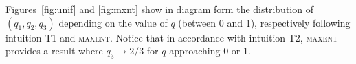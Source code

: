 \documentclass[smallextended]{svjour3}       %
\begin{document}



Figures~\ref{fig:unif} and \ref{fig:mxnt} show in diagram form the
distribution of $(q_{1},q_{2},q_{3})$ depending on the value of $q$
(between 0 and 1), respectively following intuition T1 and
\textsc{maxent}. Notice that in accordance with intuition T2,
\textsc{maxent} provides a result where $q_{3}\rightarrow{}2/3$ for
$q$ approaching 0 or 1.
\end{document}
